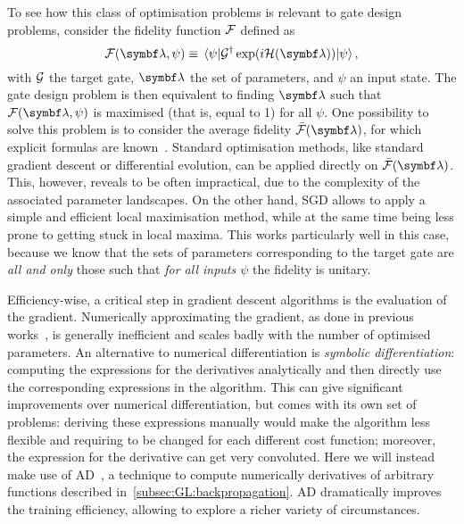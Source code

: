 To see how this class of optimisation problems is relevant to gate design problems, consider the fidelity function ${\mathcal{F}}$ defined as
\begin{equation}
	\calF(\bs\lambda, \psi) \equiv \mel{\psi}{\calG^\dagger \exp(i \calH(\bs\lambda))}{\psi},
	\label{eq:GL:def_fidelity}
\end{equation}
with ${\mathcal{G}}$ the target gate, $\bs\lambda$ the set of parameters, and $\psi$ an input state.
The gate design problem is then equivalent to finding $\bs\lambda$ such that $\calF(\bs\lambda, \psi)$ is maximised (that is, equal to 1) for all $\psi$.
One possibility to solve this problem is to consider the average fidelity $\bar{\calF}(\bs\lambda)$, for which explicit formulas are known~\cite{banchi2011nonperturbative,pedersen2007fidelity,magesan2011gate}.
Standard optimisation methods, like standard gradient descent or differential evolution, can be applied directly on $\bar{\calF}(\bs\lambda)$.
This, however, reveals to be often impractical, due to the complexity of the associated parameter landscapes.
On the other hand, \ac{SGD} allows to apply a simple and efficient local maximisation method, while at the same time being less prone to getting stuck in local maxima.
This works particularly well in this case, because we know that the sets of parameters corresponding to the target gate are \emph{all and only} those such that \emph{for all inputs $\psi$} the fidelity is unitary.

Efficiency-wise, a critical step in gradient descent algorithms is the evaluation of the gradient.
Numerically approximating the gradient, as done in previous works~\cite{banchi2016quantum}, is generally inefficient and scales badly with the number of optimised parameters.
An alternative to numerical differentiation is \emph{symbolic differentiation}: computing the expressions for the derivatives analytically and then directly use the corresponding expressions in the algorithm. This can give significant improvements over numerical differentiation, but comes with its own set of problems: deriving these expressions manually would make the algorithm less flexible and requiring to be changed for each different cost function; moreover, the expression for the derivative can get very convoluted.
Here we will instead make use of \acf{AD}~\cite{bartholomewbiggs2000automatic,bischof2008advances,baydin2018automatic}, a technique to compute numerically derivatives of arbitrary functions described in~\cref{subsec:GL:backpropagation}.
\ac{AD} dramatically improves the training efficiency, allowing to explore a richer variety of circumstances.

